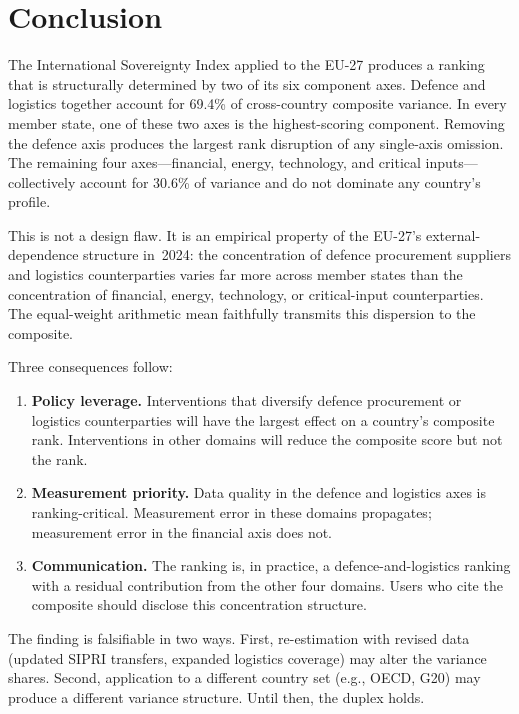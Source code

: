\section{Conclusion}\label{sec:conclusion}

The International Sovereignty Index applied to the EU-27 produces a
ranking that is structurally determined by two of its six component
axes.  Defence and logistics together account for 69.4\% of
cross-country composite variance.  In every member state, one of
these two axes is the highest-scoring component.  Removing the
defence axis produces the largest rank disruption of any single-axis
omission.  The remaining four axes---financial, energy, technology,
and critical inputs---collectively account for 30.6\% of variance
and do not dominate any country's profile.

This is not a design flaw.  It is an empirical property of the
EU-27's external-dependence structure in~2024: the concentration of
defence procurement suppliers and logistics counterparties varies
far more across member states than the concentration of financial,
energy, technology, or critical-input counterparties.  The
equal-weight arithmetic mean faithfully transmits this dispersion to
the composite.

Three consequences follow:

\begin{enumerate}[leftmargin=2em]
  \item \textbf{Policy leverage.}  Interventions that diversify
    defence procurement or logistics counterparties will have the
    largest effect on a country's composite rank.  Interventions in
    other domains will reduce the composite score but not the rank.

  \item \textbf{Measurement priority.}  Data quality in the defence
    and logistics axes is ranking-critical.  Measurement error in
    these domains propagates; measurement error in the financial axis
    does not.

  \item \textbf{Communication.}  The {\ISI} ranking is, in
    practice, a defence-and-logistics ranking with a residual
    contribution from the other four domains.  Users who cite the
    composite should disclose this concentration structure.
\end{enumerate}

\noindent
The finding is falsifiable in two ways.  First, re-estimation with
revised data (updated SIPRI transfers, expanded logistics coverage)
may alter the variance shares.  Second, application to a different
country set (e.g., OECD, G20) may produce a different variance
structure.  Until then, the duplex holds.

